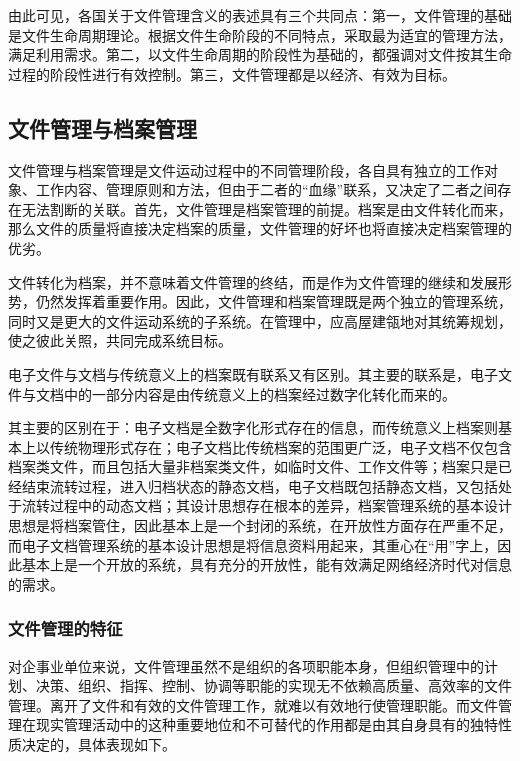     由此可见，各国关于文件管理含义的表述具有三个共同点：第一，文件管理的基础是文件生命周期理论。根据文件生命阶段的不同特点，采取最为适宜的管理方法，满足利用需求。第二，以文件生命周期的阶段性为基础的，都强调对文件按其生命过程的阶段性进行有效控制。第三，文件管理都是以经济、有效为目标。

    \subsection {文件管理与档案管理}

    文件管理与档案管理是文件运动过程中的不同管理阶段，各自具有独立的工作对象、工作内容、管理原则和方法，但由于二者的“血缘”联系，又决定了二者之间存在无法割断的关联。首先，文件管理是档案管理的前提。档案是由文件转化而来，那么文件的质量将直接决定档案的质量，文件管理的好坏也将直接决定档案管理的优劣。

    文件转化为档案，并不意味着文件管理的终结，而是作为文件管理的继续和发展形势，仍然发挥着重要作用。因此，文件管理和档案管理既是两个独立的管理系统，同时又是更大的文件运动系统的子系统。在管理中，应高屋建瓴地对其统筹规划，使之彼此关照，共同完成系统目标。

    电子文件与文档与传统意义上的档案既有联系又有区别。其主要的联系是，电子文件与文档中的一部分内容是由传统意义上的档案经过数字化转化而来的。

    其主要的区别在于：电子文档是全数字化形式存在的信息，而传统意义上档案则基本上以传统物理形式存在；电子文档比传统档案的范围更广泛，电子文档不仅包含档案类文件，而且包括大量非档案类文件，如临时文件、工作文件等；档案只是已经结束流转过程，进入归档状态的静态文档，电子文档既包括静态文档，又包括处于流转过程中的动态文档；其设计思想存在根本的差异，档案管理系统的基本设计思想是将档案管住，因此基本上是一个封闭的系统，在开放性方面存在严重不足，而电子文档管理系统的基本设计思想是将信息资料用起来，其重心在“用”字上，因此基本上是一个开放的系统，具有充分的开放性，能有效满足网络经济时代对信息的需求。

    \subsubsection {文件管理的特征}

    对企事业单位来说，文件管理虽然不是组织的各项职能本身，但组织管理中的计划、决策、组织、指挥、控制、协调等职能的实现无不依赖高质量、高效率的文件管理。离开了文件和有效的文件管理工作，就难以有效地行使管理职能。而文件管理在现实管理活动中的这种重要地位和不可替代的作用都是由其自身具有的独特性质决定的，具体表现如下。

